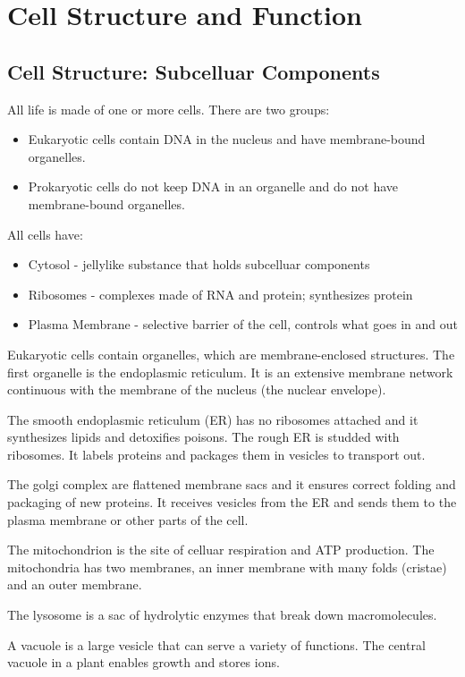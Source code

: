 \documentclass[../bio.tex]{subfiles}
\begin{document}
\chapter{Cell Structure and Function}
\section{Cell Structure: Subcelluar Components}
All life is made of one or more cells. There are two groups:
\begin{itemize}
    \item Eukaryotic cells contain DNA in the nucleus and have membrane-bound organelles.
    \item Prokaryotic cells do not keep DNA in an organelle and do not have membrane-bound organelles. 
\end{itemize}
All cells have:
\begin{itemize}
    \item Cytosol - jellylike substance that holds subcelluar components 
    \item Ribosomes - complexes made of RNA and protein; synthesizes protein
    \item Plasma Membrane - selective barrier of the cell, controls what goes in and out
\end{itemize}
Eukaryotic cells contain organelles, which are membrane-enclosed structures. The first organelle is the endoplasmic reticulum. It is an extensive membrane network continuous with the membrane of the nucleus (the nuclear envelope).

The smooth endoplasmic reticulum (ER) has no ribosomes attached and it synthesizes lipids and detoxifies poisons. The rough ER is studded with ribosomes. It labels proteins and packages them in vesicles to transport out.

The golgi complex are flattened membrane sacs and it ensures correct folding and packaging of new proteins. It receives vesicles from the ER and sends them to the plasma membrane or other parts of the cell.

The mitochondrion is the site of celluar respiration and ATP production. The mitochondria has two membranes, an inner membrane with many folds (cristae) and an outer membrane.

The lysosome is a sac of hydrolytic enzymes that break down macromolecules. 

A vacuole is a large vesicle that can serve a variety of functions. The central vacuole in a plant enables growth and stores ions.
\end{document}
